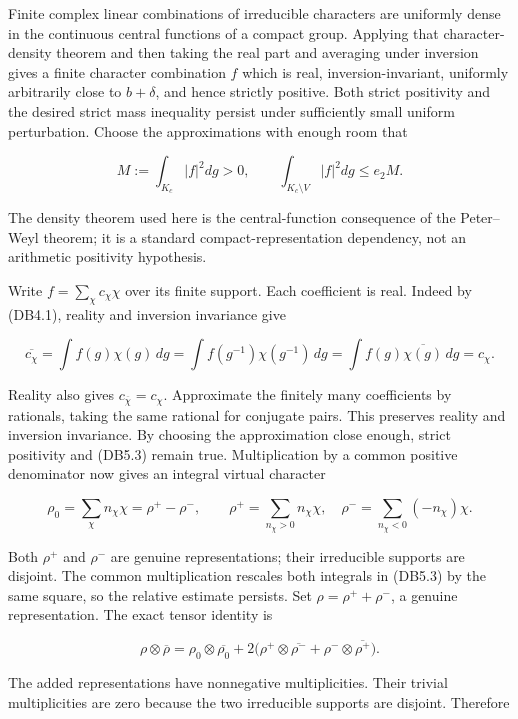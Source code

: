 \documentclass[
]{report}
\begin{document}
Finite complex linear combinations of irreducible characters are
uniformly dense in the continuous central functions of a compact group.
Applying that character-density theorem and then taking the real part
and averaging under inversion gives a finite character combination \(f\)
which is real, inversion-invariant, uniformly arbitrarily close to
\(b+\delta\), and hence strictly positive. Both strict positivity and
the desired strict mass inequality persist under sufficiently small
uniform perturbation. Choose the approximations with enough room that

\[
 M:=\int_{K_c}|f|^2dg>0,\qquad
 \int_{K_c\setminus V}|f|^2dg\leq e_2M.
 \tag{DB5.3}
\]

The density theorem used here is the central-function consequence of the
Peter--Weyl theorem; it is a standard compact-representation dependency,
not an arithmetic positivity hypothesis.

Write \(f=\sum_\chi c_\chi\chi\) over its finite support. Each
coefficient is real. Indeed by (DB4.1), reality and inversion invariance
give

\[
 \overline{c_\chi}=\int f(g)\chi(g)\,dg
  =\int f(g^{-1})\chi(g^{-1})\,dg
  =\int f(g)\overline{\chi(g)}\,dg=c_\chi.
 \tag{DB5.4}
\]

Reality also gives \(c_{\overline\chi}=c_\chi\). Approximate the
finitely many coefficients by rationals, taking the same rational for
conjugate pairs. This preserves reality and inversion invariance. By
choosing the approximation close enough, strict positivity and (DB5.3)
remain true. Multiplication by a common positive denominator now gives
an integral virtual character

\[
 \rho_0=\sum_\chi n_\chi\chi=\rho^+-\rho^-,\qquad
 \rho^+=\sum_{n_\chi>0}n_\chi\chi,\quad
 \rho^-=\sum_{n_\chi<0}(-n_\chi)\chi.
 \tag{DB5.5}
\]

Both \(\rho^+\) and \(\rho^-\) are genuine representations; their
irreducible supports are disjoint. The common multiplication rescales
both integrals in (DB5.3) by the same square, so the relative estimate
persists. Set \(\rho=\rho^++\rho^-\), a genuine representation. The
exact tensor identity is

\[
 \rho\otimes\overline\rho
  =\rho_0\otimes\overline{\rho_0}
   +2\bigl(\rho^+\otimes\overline{\rho^-}
                +\rho^-\otimes\overline{\rho^+}\bigr).
 \tag{DB5.6}
\]

The added representations have nonnegative multiplicities. Their trivial
multiplicities are zero because the two irreducible supports are
disjoint. Therefore
\end{document}
